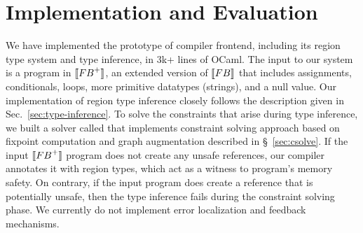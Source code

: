 \section{Implementation and Evaluation}
\label{sec:implementation}

We have implemented the prototype of \name compiler frontend,
including its region type system and type inference, in 3k+ lines of
OCaml. The input to our system is a program in $\llbracket {\sc FB}^+ \rrbracket$, an extended
version of $\llbracket {\sc FB} \rrbracket$ that includes assignments, conditionals,
loops, more primitive datatypes (\eg strings), and a null value. 
Our implementation of region type inference closely follows the
description given in Sec.~\ref{sec:type-inference}. To solve the
constraints that arise during type inference, we built a solver called
\csolve that implements constraint solving approach based on fixpoint
computation and graph augmentation described in \S~\ref{sec:csolve}. 
If the input $\llbracket {\sc FB}^+ \rrbracket$ program does not create any unsafe
references, our compiler annotates it with region types, which act as
a witness to program's memory safety. On contrary, if the input
program does create a reference that is potentially unsafe, then the
type inference fails during the constraint solving phase. We currently
do not implement error localization and feedback mechanisms.

